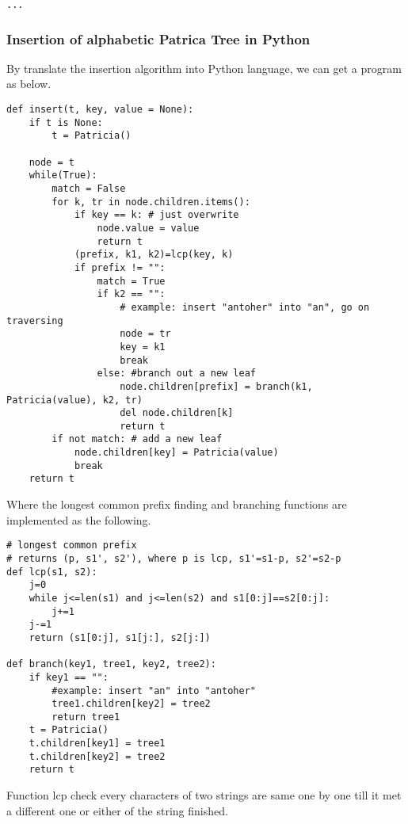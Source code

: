 \documentclass{article}
\begin{document}
\lstset{language=C++}
\begin{lstlisting}
...
\end{lstlisting}


\subsubsection*{Insertion of alphabetic Patrica Tree in Python}
By translate the insertion algorithm into Python language, we can get a
program as below.

\lstset{language=Python}
\begin{lstlisting}
def insert(t, key, value = None):
    if t is None:
        t = Patricia()

    node = t
    while(True):
        match = False
        for k, tr in node.children.items():
            if key == k: # just overwrite
                node.value = value
                return t
            (prefix, k1, k2)=lcp(key, k)
            if prefix != "":
                match = True
                if k2 == "": 
                    # example: insert "antoher" into "an", go on traversing
                    node = tr
                    key = k1
                    break
                else: #branch out a new leaf
                    node.children[prefix] = branch(k1, Patricia(value), k2, tr)
                    del node.children[k]
                    return t
        if not match: # add a new leaf
            node.children[key] = Patricia(value)
            break
    return t
\end{lstlisting}

Where the longest common prefix finding and branching functions are implemented
as the following.

\begin{lstlisting}
# longest common prefix
# returns (p, s1', s2'), where p is lcp, s1'=s1-p, s2'=s2-p
def lcp(s1, s2):
    j=0
    while j<=len(s1) and j<=len(s2) and s1[0:j]==s2[0:j]:
        j+=1
    j-=1
    return (s1[0:j], s1[j:], s2[j:])

def branch(key1, tree1, key2, tree2):
    if key1 == "":
        #example: insert "an" into "antoher"
        tree1.children[key2] = tree2
        return tree1
    t = Patricia()
    t.children[key1] = tree1
    t.children[key2] = tree2
    return t
\end{lstlisting}

Function lcp check every characters of two strings are same one by one 
till it met a different one or either of the string finished. 
\end{document}

